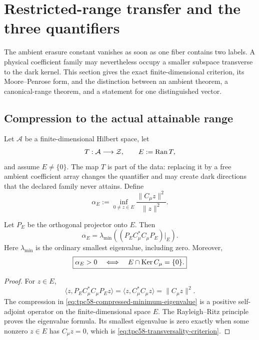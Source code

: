 \section{Restricted-range transfer and the three quantifiers}
\label{sec:tpc58-restricted-range}

The ambient erasure constant vanishes as soon as one fiber contains two
labels.  A physical coefficient family may nevertheless occupy a smaller
subspace transverse to the dark kernel.  This section gives the exact
finite-dimensional criterion, its Moore--Penrose form, and the distinction
between an ambient theorem, a canonical-range theorem, and a statement for
one distinguished vector.

\subsection{Compression to the actual attainable range}

Let \(\mathcal A\) be a finite-dimensional Hilbert space, let
\begin{equation}
 T:\mathcal A\longrightarrow\mathcal Z,
 \qquad
 E:=\operatorname{Ran} T,
 \label{eq:tpc58-attainable-range}
\end{equation}
and assume \(E\ne\{0\}\).  The map \(T\) is part of the data: replacing it
by a free ambient coefficient array changes the quantifier and may create
dark directions that the declared family never attains.  Define
\begin{equation}
 \alpha_E
 :=\inf_{0\ne z\in E}
   \frac{\|C_\mu z\|^2}{\|z\|^2}.
 \label{eq:tpc58-restricted-transfer-constant}
\end{equation}

\begin{theorem}
\label{thm:tpc58-exact-restricted-range}
Let \(P_E\) be the orthogonal projector onto \(E\).  Then
\begin{equation}
 \boxed{
 \alpha_E
 =\lambda_{\min}\!\left(
   (P_EC_\mu^*C_\mu P_E)|_E\right).}
 \label{eq:tpc58-compressed-minimum-eigenvalue}
\end{equation}
Here \(\lambda_{\min}\) is the ordinary smallest eigenvalue, including
zero.  Moreover,
\begin{equation}
 \boxed{
 \alpha_E>0
 \quad\Longleftrightarrow\quad
 E\cap\operatorname{Ker} C_\mu=\{0\}.}
 \label{eq:tpc58-transversality-criterion}
\end{equation}
\end{theorem}

\begin{proof}
For \(z\in E\),
\begin{equation}
 \langle z,P_EC_\mu^*C_\mu P_Ez\rangle
 =\langle z,C_\mu^*C_\mu z\rangle
 =\|C_\mu z\|^2.
 \label{eq:tpc58-compression-rayleigh-identity}
\end{equation}
The compression in
\eqref{eq:tpc58-compressed-minimum-eigenvalue} is a positive self-adjoint
operator on the finite-dimensional space \(E\).  The Rayleigh--Ritz
principle proves the eigenvalue formula.  Its smallest eigenvalue is zero
exactly when some nonzero \(z\in E\) has \(C_\mu z=0\), which is
\eqref{eq:tpc58-transversality-criterion}.
\end{proof}

